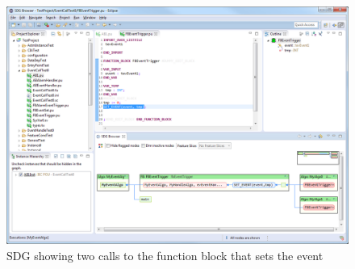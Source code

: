 \begin{figure}[p]
  \centering
    \includegraphics[width=\textwidth]{bilder/manual-event2}
  \caption{SDG showing two calls to the function block that sets the event}
  \label{fig:manual-event2}
\end{figure}

